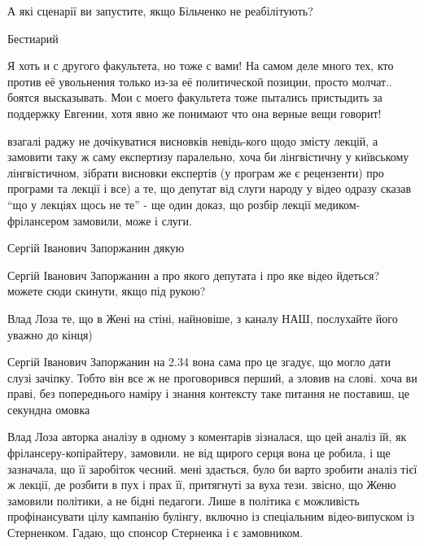 \begin{itemize}
А які сценарії ви запустите, якщо Більченко не реабілітують?


Бестиарий


Я хоть и с другого факультета, но тоже с вами! На самом деле много тех, кто
против её увольнения только из-за её политической позиции, просто молчат..
боятся высказывать. Мои с моего факультета тоже пытались пристыдить за
поддержку Евгении, хотя явно же понимают что она верные вещи говорит!


взагалі раджу не дочікуватися висновків невідь-кого щодо змісту лекцій, а
замовити таку ж саму експертизу паралельно, хоча би лінгвістичну у київському
лінгвістичном, зібрати висновки експертів (у програм же є рецензенти) про
програми та лекції і все) а те, що депутат від слуги народу у відео одразу
сказав \enquote{що у лекціях щось не те} - ще один доказ, що розбір лекції
медиком-фрілансером замовили, може і слуги.

\begin{itemize}

Сергій Іванович Запоржанин дякую


Сергій Іванович Запоржанин а про якого депутата і про яке відео йдеться? можете
сюди скинути, якщо під рукою?


Влад Лоза те, що в Жені на стіні, найновіше, з каналу НАШ, послухайте його уважно до кінця)


Сергій Іванович Запоржанин на 2.34 вона сама про це згадує, що могло дати слузі
зачіпку. Тобто він все ж не проговорився перший, а зловив на слові. хоча ви
праві, без попереднього наміру і знання контексту таке питання не поставиш, це
секундна омовка


Влад Лоза авторка аналізу в одному з коментарів зізналася, що цей аналіз їй, як
фрілансеру-копірайтеру, замовили. не від щирого серця вона це робила, і ще
зазначала, що її заробіток чесний. мені здається, було би варто зробити аналіз
тієї ж лекції, де розбити в пух і прах її, притягнуті за вуха тези. звісно, що
Женю замовили політики, а не бідні педагоги. Лише в політика є можливість
профінансувати цілу кампанію булінгу, включно із спеціальним відео-випуском із
Стерненком. Гадаю, що спонсор Стерненка і є замовником.


\end{itemize}
\end{itemize}
